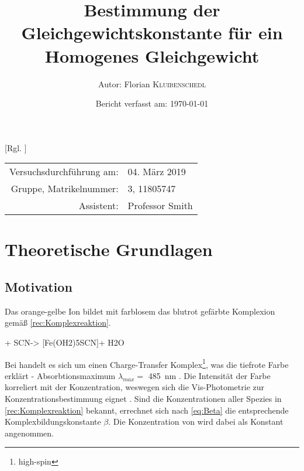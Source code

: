 \documentclass{article}
\title{Bestimmung der Gleichgewichtskonstante für ein Homogenes Gleichgewicht} %
\author{Autor: Florian \textsc{Kluibenschedl}} %
\date{Bericht verfasst am: \today} %
\begin{document}
  [Rgl. ]{}{}
  
  \maketitle %
  
  \begin{center}
    \begin{tabular}{r l}
      Versuchsdurchführung am: & 04. März 2019\\ %
      Gruppe, Matrikelnummer: & 3, 11805747 \\
      Assistent: & Professor Smith %
    \end{tabular}
  \end{center}


  \begin{abstract}
    
  \end{abstract}
  
  \section{Theoretische Grundlagen}
  
    \subsection{Motivation} \label{sec:Motivation}
      
      Das orange-gelbe  Ion bildet mit farblosem  das blutrot gefärbte Komplexion \ch{[Fe(OH2)5SCN]\pch[2]} gemäß \ref{rec:Komplexreaktion}. 

      \begin{reaction}
        [Fe(OH2)6]\pch[3] + SCN\mch -> [Fe(OH2)5SCN]\pch[2] + H2O \label{rec:Komplexreaktion} \\
      \end{reaction}
      
      Bei \ch{[Fe(OH2)5SCN]\pch[2]} handelt es sich um einen Charge-Transfer Komplex\footnote{high-spin}, was die tiefrote Farbe erklärt - Absorbtionsmaximum $\lambda _{max} = $ \SI[mode=text]{485}{\nano\meter} \cite[S. 540]{InorganicChemistry}. Die Intensität der Farbe korreliert mit der Konzentration, weswegen sich die Vis-Photometrie zur Konzentrationsbestimmung eignet \cite[S. 108]{TaschenatlasAnallytik}. Sind die Konzentrationen aller Spezies in \ref{rec:Komplexreaktion} bekannt, errechnet sich nach \eqref{eq:Beta} die entsprechende Komplexbildungskonstante $\beta$. Die Konzentration von  wird dabei als Konstant angenommen.
      
\end{document}

